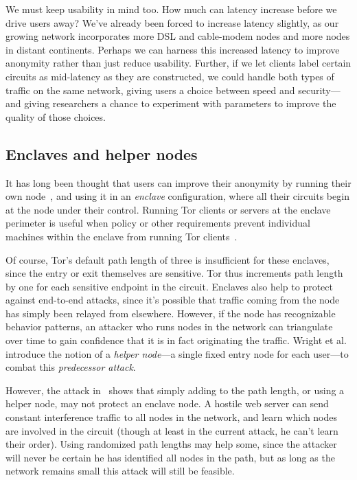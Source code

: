 \documentclass{llncs}
\begin{document}
We must keep usability in mind too. How much can latency increase
before we drive users away? We've already been forced to increase
latency slightly, as our growing network incorporates more DSL and
cable-modem nodes and more nodes in distant continents. Perhaps we can
harness this increased latency to improve anonymity rather than just
reduce usability. Further, if we let clients label certain circuits as
mid-latency as they are constructed, we could handle both types of traffic
on the same network, giving users a choice between speed and security---and
giving researchers a chance to experiment with parameters to improve the
quality of those choices.

\subsection{Enclaves and helper nodes}
\label{subsec:helper-nodes}

It has long been thought that users can improve their anonymity by
running their own node~\cite{tor-design,or-ih96,or-pet00}, and using
it in an \emph{enclave} configuration, where all their circuits begin
at the node under their control. Running Tor clients or servers at
the enclave perimeter is useful when policy or other requirements
prevent individual machines within the enclave from running Tor
clients~\cite{or-jsac98,or-discex00}.

Of course, Tor's default path length of
three is insufficient for these enclaves, since the entry or exit
themselves are sensitive. Tor thus increments path length by one
for each sensitive endpoint in the circuit.
Enclaves also help to protect against end-to-end attacks, since it's
possible that traffic coming from the node has simply been relayed from
elsewhere. However, if the node has recognizable behavior patterns,
an attacker who runs nodes in the network can triangulate over time to
gain confidence that it is in fact originating the traffic. Wright et
al.~\cite{wright03} introduce the notion of a \emph{helper node}---a
single fixed entry node for each user---to combat this \emph{predecessor
attack}.

However, the attack in~\cite{attack-tor-oak05} shows that simply adding
to the path length, or using a helper node, may not protect an enclave
node. A hostile web server can send constant interference traffic to
all nodes in the network, and learn which nodes are involved in the
circuit (though at least in the current attack, he can't learn their
order). Using randomized path lengths may help some, since the attacker
will never be certain he has identified all nodes in the path, but as
long as the network remains small this attack will still be feasible.
\end{document}
